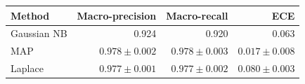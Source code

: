 \begin{tabular}{lrrr}\toprule
Method & Macro-precision & Macro-recall & ECE \\\midrule
Gaussian NB & 0.924 & 0.920 & 0.063\\
MAP & $0.978\pm 0.002$ & $0.978\pm 0.003$ & $0.017\pm 0.008$\\
Laplace & $0.977\pm 0.001$ & $0.977\pm 0.002$ & $0.080\pm 0.003$\\
\bottomrule\end{tabular}